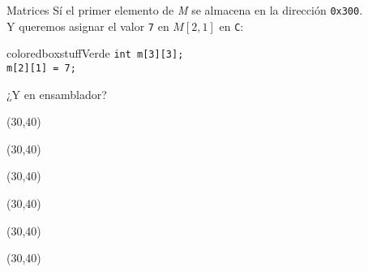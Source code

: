 \documentclass[aspectratio=169]{beamer}
\begin{document}
\begin{frame}[fragile,t]{Matrices}
    Sí el primer elemento de \textit{M} se almacena en la dirección \texttt{0x300}.\\
    Y queremos asignar el valor \texttt{7} en $M[2,1]$ en \texttt{C}:
    \vskip 5pt
    \pause
    \begin{beamercolorbox}[wd=1\textwidth,sep=0.5em]{coloredboxstuffVerde}
    \large
    \verb|int m[3][3];|\\
    \verb|m[2][1] = 7;|
    \end{beamercolorbox}
    \pause
    \hspace{10,5cm}¿Y en ensamblador?
    \begin{textblock}{50}(30,40)  \end{textblock}
    \begin{textblock}{50}(30,40)  \end{textblock}
    \begin{textblock}{50}(30,40)  \end{textblock}
    \begin{textblock}{50}(30,40)  \end{textblock}
    \begin{textblock}{50}(30,40)  \end{textblock}
    \begin{textblock}{50}(30,40)  \end{textblock}
\end{frame}
\end{document}
